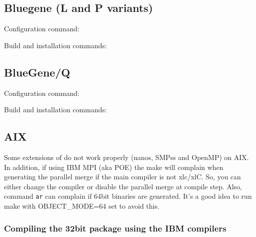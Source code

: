 \subsection{Bluegene (L and P variants)}

Configuration command:


Build and installation commands:


\subsection{BlueGene/Q}

Configuration command:


Build and installation commands:


\subsection{AIX}

Some extensions of \TRACE do not work properly (nanos, SMPss and OpenMP) on AIX. In addition, if using IBM MPI (aka POE) the make will complain when generating the parallel merge if the main compiler is not xlc/xlC. So, you can either change the compiler or disable the parallel merge at compile step. Also, command {\tt ar} can complain if 64bit binaries are generated. It's a good idea to run make with OBJECT\_MODE=64 set to avoid this.

\subsubsection{Compiling the 32bit package using the IBM compilers}

